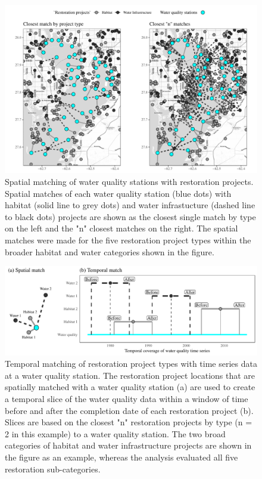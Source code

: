 \documentclass[]{article}
\begin{document}
\begin{figure}
\includegraphics[width=\textwidth]{figs/spmtch} \caption{Spatial matching of water quality stations with restoration projects. Spatial matches of each water quality station (blue dots) with habitat (solid line to grey dots) and water infrastucture (dashed line to black dots) projects are shown as the closest single match by type on the left and the "n" closest matches on the right.  The spatial matches were made for the five restoration project types within the broader habitat and water categories shown in the figure.}\label{fig:spmtch}
\end{figure}

\begin{figure}
\includegraphics[width=\textwidth]{figs/tmmtch} \caption{Temporal matching of restoration project types with time series data at a water quality station.  The restoration project locations that are spatially matched with a water quality station (a) are used to create a temporal slice of the water quality data within a window of time before and after the completion date of each restoration project (b).  Slices are based on the closest "n" restoration projects by type (n = 2 in this example) to a water quality station.  The two broad categories of habitat and water infrastructure projects are shown in the figure as an example, whereas the analysis evaluated all five restoration sub-categories.}\label{fig:tmmtch}
\end{figure}
\end{document}
